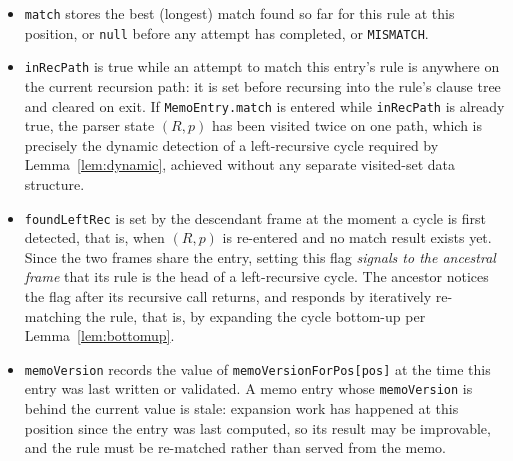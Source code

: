 \documentclass[manuscript]{acmart}
\newcommand{\cd}[1]{\texttt{#1}}
\begin{document}
\begin{itemize}
    \item \cd{match} stores the best (longest) match found so far for this rule at this position, or \cd{null} before any attempt has completed, or \cd{MISMATCH}.

    \item \cd{inRecPath} is true while an attempt to match this entry's rule is anywhere on the current recursion path: it is set before recursing into the rule's clause tree and cleared on exit. If \cd{MemoEntry.match} is entered while \cd{inRecPath} is already true, the parser state $(R, p)$ has been visited twice on one path, which is precisely the dynamic detection of a left-recursive cycle required by Lemma~\ref{lem:dynamic}, achieved without any separate visited-set data structure.

    \item \cd{foundLeftRec} is set by the descendant frame at the moment a cycle is first detected, that is, when $(R, p)$ is re-entered and no match result exists yet. Since the two frames share the entry, setting this flag \emph{signals to the ancestral frame} that its rule is the head of a left-recursive cycle. The ancestor notices the flag after its recursive call returns, and responds by iteratively re-matching the rule, that is, by expanding the cycle bottom-up per Lemma~\ref{lem:bottomup}.

    \item \cd{memoVersion} records the value of \cd{memoVersionForPos[pos]} at the time this entry was last written or validated. A memo entry whose \cd{memoVersion} is behind the current value is stale: expansion work has happened at this position since the entry was last computed, so its result may be improvable, and the rule must be re-matched rather than served from the memo.
\end{itemize}
\end{document}

